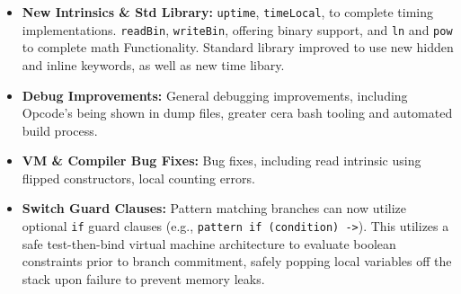 \documentclass[11pt, a4paper]{article}
\begin{document}
\begin{itemize}
    \item \textbf{New Intrinsics \& Std Library: } \texttt{uptime}, \texttt{timeLocal}, to complete timing implementations. \texttt{readBin}, \texttt{writeBin}, offering binary support, and \texttt{ln} and \texttt{pow} to complete math Functionality. Standard library improved to use new hidden and inline keywords, as well as new time libary.
    \item \textbf{Debug Improvements: } General debugging improvements, including Opcode's being shown in dump files, greater cera bash tooling and automated build process.
    \item \textbf{VM \& Compiler Bug Fixes: } Bug fixes, including read intrinsic using flipped constructors, local counting errors.
    \item \textbf{Switch Guard Clauses:} Pattern matching branches can now utilize optional \texttt{if} guard clauses (e.g., \texttt{pattern if (condition) ->}). This utilizes a safe test-then-bind virtual machine architecture to evaluate boolean constraints prior to branch commitment, safely popping local variables off the stack upon failure to prevent memory leaks.
\end{itemize}

\end{document}
